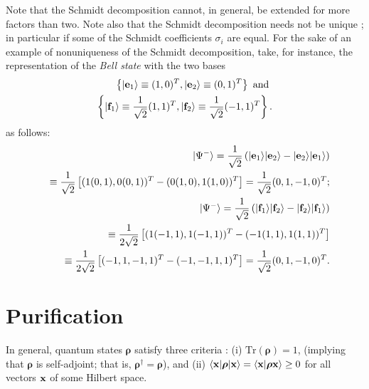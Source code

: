Note that the Schmidt decomposition cannot, in general, be extended for more factors than two.
Note also that the Schmidt decomposition needs not be unique \cite{ekert:415};
in particular if some of the Schmidt coefficients $\sigma_i$ are equal.
For the sake of an example of nonuniqueness of the Schmidt decomposition,
take, for instance, the representation of the {\em Bell state} 
with the two bases
\begin{equation}
\begin{split}
\left\{
\vert {\bf e}_1\rangle \equiv (1,0)^T,
\vert {\bf e}_2\rangle \equiv (0,1)^T
\right\}
\textrm{ and }\\
\left\{
\vert {\bf f}_1\rangle \equiv \frac{1}{\sqrt{2}}(1,1)^T,
\vert {\bf f}_2\rangle \equiv \frac{1}{\sqrt{2}}(-1,1)^T
\right\}.
\end{split}
\end{equation}
as follows:
\begin{equation}
\begin{split}
\vert {\Psi^-} \rangle =
\frac{1}{\sqrt{2}}
\left(
\vert {\bf e}_1\rangle
\vert {\bf e}_2\rangle
-
\vert {\bf e}_2\rangle
\vert {\bf e}_1\rangle
\right)\\
\quad \equiv
\frac{1}{\sqrt{2}}
\left[
(1 (0,1),0(0,1))^T- (0 (1,0),1(1,0))^T\right] = \frac{1}{\sqrt{2}} (0,1,-1,0)^T; \\
\vert {\Psi^-} \rangle =
\frac{1}{\sqrt{2}}
\left(
\vert {\bf f}_1\rangle
\vert {\bf f}_2\rangle
-
\vert {\bf f}_2\rangle
\vert {\bf f}_1\rangle
\right) \\
\quad \equiv
\frac{1}{2\sqrt{2}}
\left[
(1 (-1,1),1(-1,1))^T- ( -1 (1,1),1(1,1))^T\right]  \\
\quad \equiv
\frac{1}{2\sqrt{2}}
\left[
( -1  , 1 ,-1 ,1 )^T - ( -1,-1 ,1 ,1 )^T\right]
 = \frac{1}{\sqrt{2}} (0,1,-1,0)^T
.
\end{split}
\end{equation}



\section{Purification}
\label{2015-m-ch-fdvs-purification}


In general, quantum states ${\boldsymbol{\rho}}$ satisfy three criteria \cite{ba-89}:
(i)
$\textrm{Tr}({\boldsymbol{\rho}}) =1$,
(implying that ${\boldsymbol{\rho}}$ is self-adjoint; that is, ${\boldsymbol{\rho}}^\dagger ={\boldsymbol{\rho}}$), and
(ii)
$
\langle {\bf x} \vert {\boldsymbol{\rho}} \vert {\bf x} \rangle
=\langle {\bf x} \vert {\boldsymbol{\rho}}  {\bf x} \rangle \ge  0
$ for all vectors ${\bf x}$ of some  Hilbert space.

